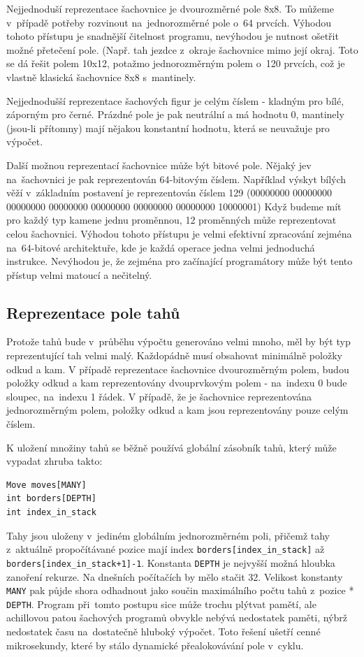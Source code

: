 \documentclass[11pt, titlepage]{article}
\begin{document}
Nejjednoduší reprezentace šachovnice je dvourozměrné pole 8x8. To můžeme v~případě potřeby rozvinout na~jednorozměrné pole o~64 prvcích. Výhodou tohoto přístupu je snadnější čitelnost programu, nevýhodou je nutnost ošetřit možné přetečení pole. (Např. tah jezdce z~okraje šachovnice mimo její okraj. Toto se dá řešit polem 10x12, potažmo jednorozměrným polem o~120 prvcích, což je vlastně klasická šachovnice 8x8 s~mantinely.

Nejjednodušší reprezentace šachových figur je celým číslem - kladným pro bílé, záporným pro černé. Prázdné pole je pak neutrální a má hodnotu 0, mantinely (jsou-li přítomny) mají nějakou konstantní hodnotu, která se neuvažuje pro výpočet.

Další možnou reprezentací šachovnice může být bitové pole. Nějaký jev na~šachovnici je pak reprezentován 64-bitovým číslem. Například výskyt bílých věží v~základním postavení je reprezentován číslem 129 (00000000 00000000 00000000 00000000 00000000 00000000 00000000 10000001) Když budeme mít pro každý typ kamene jednu proměnnou, 12 proměnných může reprezentovat celou šachovnici. Výhodou tohoto přístupu je velmi efektivní zpracování zejména na~64-bitové architektuře, kde je každá operace jedna velmi jednoduchá instrukce. Nevýhodou je, že zejména pro začínající programátory může být tento přístup velmi matoucí a nečitelný.

\subsection{Reprezentace pole tahů}

Protože tahů bude v~průběhu výpočtu generováno velmi mnoho, měl by být typ reprezentující tah velmi malý. Každopádně musí obsahovat minimálně položky odkud a kam. V případě reprezentace šachovnice dvourozměrným polem, budou položky odkud a kam reprezentovány dvouprvkovým polem - na~indexu 0 bude sloupec, na~indexu 1 řádek. V případě, že je šachovnice reprezentována jednorozměrným polem, položky odkud a kam jsou reprezentovány pouze celým číslem.

K uložení množiny tahů se běžně používá globální zásobník tahů, který může vypadat zhruba takto:
\begin{verbatim}
Move moves[MANY]
int borders[DEPTH]
int index_in_stack
\end{verbatim}

Tahy jsou uloženy v~jediném globálním jednorozměrném poli, přičemž tahy z~aktuálně propočítávané pozice mají index {\tt borders[index\_in\_stack]} až {\tt borders[index\_in\_stack+1]-1}. Konstanta {\tt DEPTH} je nejvyšší možná hloubka zanoření rekurze. Na dnešních počítačích by mělo stačit 32. Velikost konstanty {\tt MANY} pak půjde shora odhadnout jako součin maximálního počtu tahů z~pozice * {\tt DEPTH}. Program při~tomto postupu sice může trochu plýtvat pamětí, ale achillovou patou šachových programů obvykle nebývá nedostatek paměti, nýbrž nedostatek času na~dostatečně hluboký výpočet. Toto řešení ušetří cenné mikrosekundy, které by stálo dynamické přealokovávání pole v~cyklu.
\end{document}
